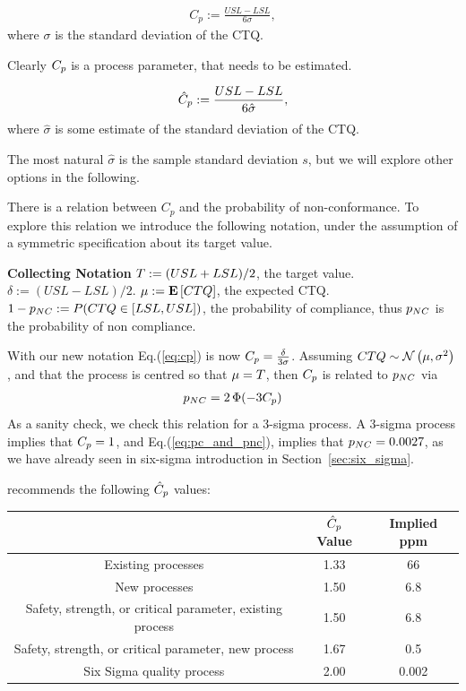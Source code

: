 \begin{definition}[$\cp$]
\begin{align}
\label{eq:cp}
	C_p:= \frac{USL-LSL}{6 \sigma}, 
\end{align}
where $\sigma$ is the standard deviation of the CTQ.

\end{definition}
Clearly $\cp$ is a process parameter, that needs to be estimated.
\begin{definition}[$\cpHat$]
\begin{align}
	\hat{C}_p:= \frac{USL-LSL}{6 \hat{\sigma}}, 
\end{align}
where $\hat{\sigma}$ is some estimate of the standard deviation of the CTQ.
\end{definition}
The most natural $\hat{\sigma}$ is the sample standard deviation $s$, but we will explore other options in the following.


There is a relation between $C_p$ and the probability of non-conformance. 
To explore this relation we introduce the following notation, under the assumption of a symmetric specification about its target value.
\begin{tcolorbox}
\footnotesize
\textbf{Collecting Notation} \newline
$T:= (USL+LSL)/2$, the target value. \newline
$\delta:= (USL-LSL)/2$.  \newline
$\mu:= \mathbf{E}\left[ CTQ \right]$, the expected CTQ. \newline
$1-p_{NC}:= P(CTQ \in [LSL,USL])$, the probability of compliance, thus $p_{NC}$ is the probability of non compliance. 
\end{tcolorbox}

With our new notation Eq.(\ref{eq:cp}) is now $C_p=\frac{\delta}{3 \sigma}$.
Assuming $CTQ \sim \mathcal{N}\left(\mu, \sigma^2\right)$, and that the process is centred so that $\mu=T$, then $\cp$ is related to $p_{NC}$ via
\begin{align}
\label{eq:pc_and_pnc}
 p_{NC}= 2\, \Phi(-3 C_p)
\end{align}
As a sanity check, we check this relation for a 3-sigma process.
A 3-sigma process implies that $C_p=1$, and Eq.(\ref{eq:pc_and_pnc}), implies that $p_{NC}=0.0027$, as we have already seen in six-sigma introduction in Section~\ref{sec:six_sigma}.

\cite{montgomery_introduction_2007} recommends the following $\cpHat$ values:

\begin{tabular}{|c|c|c|}
\hline  & $\cpHat$ Value & Implied ppm \\ 
\hline \hline Existing processes
 & 1.33
 & 66 \\ 
\hline New processes
 & 1.50
 & 6.8 \\ 
\hline Safety, strength, or critical
parameter, existing process
 & 1.50
 & 6.8 \\ 
\hline Safety, strength, or critical
parameter, new process
 & 1.67
 & 0.5 \\ 
\hline Six Sigma quality process & 2.00 &  0.002 \\ 
\hline 
\end{tabular} 

